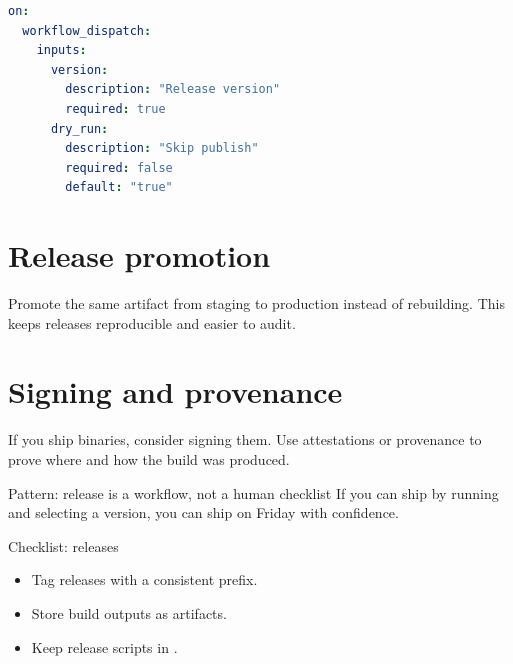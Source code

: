 \begin{lstlisting}[language=YAML]
on:
  workflow_dispatch:
    inputs:
      version:
        description: "Release version"
        required: true
      dry_run:
        description: "Skip publish"
        required: false
        default: "true"
\end{lstlisting}

\section{Release promotion}
Promote the same artifact from staging to production instead of rebuilding.
This keeps releases reproducible and easier to audit.

\section{Signing and provenance}
If you ship binaries, consider signing them.
Use attestations or provenance to prove where and how the build was produced.

\begin{patternbox}{Pattern: release is a workflow, not a human checklist}
If you can ship by running  and selecting a version,
you can ship on Friday with confidence.
\end{patternbox}

\begin{checklistbox}{Checklist: releases}
\begin{itemize}[nosep]
  \item Tag releases with a consistent prefix.
  \item Store build outputs as artifacts.
  \item Keep release scripts in .
\end{itemize}
\end{checklistbox}

